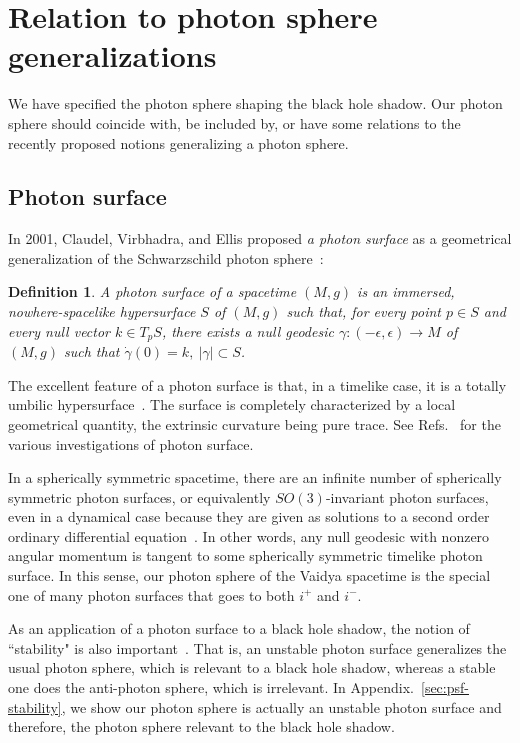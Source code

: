 \documentclass[prd,showpacs,preprintnumbers,groupedaddress,superscriptaddress,nofootinbib,11pt]{revtex4-1} %
\theoremstyle{newplain}
\newtheorem{definition}{Definition}
\begin{document}
\afterpage{\clearpage}
\newpage

\section{Relation to photon sphere generalizations}
\label{sec:discussion}
We have specified the photon sphere shaping the black hole shadow.
Our photon sphere should coincide with, be included by, or have some relations to the recently proposed notions generalizing a photon sphere.

\subsection{Photon surface}
In 2001, Claudel, Virbhadra, and Ellis proposed {\it a photon surface} as a geometrical generalization of the Schwarzschild photon sphere~\cite{claudel}:
\begin{definition}%
\label{definition:photonsurface}
A photon surface of a spacetime $(M, {g})$ is an immersed, nowhere-spacelike
hypersurface $S$ of $(M, {g})$ such that, for every point $p\in S$ and every null vector ${k}\in T_pS$, there exists a null geodesic $\gamma\colon (-\epsilon,\epsilon) \to M$ of $(M, {g})$ such that $\dot{\gamma}(0) ={k},~ |\gamma|\subset S$.
\end{definition}
The excellent feature of a photon surface is that, in a timelike case, it is a totally umbilic hypersurface~\cite{claudel,perlick}.
The surface is completely characterized by a local geometrical quantity, the extrinsic curvature being pure trace.
See Refs.~\cite{cederbaum,cederbaum_maxwell,yazadjiev_psuniqueness,rogatko_psuniqueness,koga3,tsuchiya,koga:psf-wht,Koga_2021,Kobialko_2021} for the various investigations of photon surface.
\par
In a spherically symmetric spacetime, there are an infinite number of spherically symmetric photon surfaces, or equivalently $SO(3)$-invariant photon surfaces, even in a dynamical case because they are given as solutions to a second order ordinary differential equation~\cite{claudel}.
In other words, any null geodesic with nonzero angular momentum is tangent to some spherically symmetric timelike photon surface.
In this sense, our photon sphere of the Vaidya spacetime is the special one of many photon surfaces that goes to both $i^+$ and $i^-$.
\par
As an application of a photon surface to a black hole shadow, the notion of ``stability" is also important~\cite{koga_2019}.
That is, an unstable photon surface generalizes the usual photon sphere, which is relevant to a black hole shadow, whereas a stable one does the anti-photon sphere, which is irrelevant.
In Appendix.~\ref{sec:psf-stability}, we show our photon sphere is actually an unstable photon surface and therefore, the photon sphere relevant to the black hole shadow.
\end{document}
